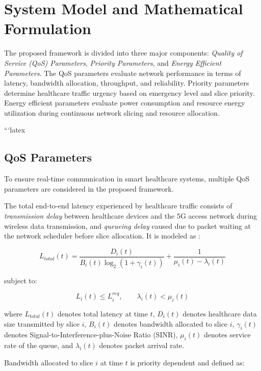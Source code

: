 \documentclass[10pt,journal,compsoc]{IEEEtran}
\begin{document}
\section{System Model and Mathematical Formulation}\label{SecIII}

The proposed framework is divided into three major components: \textit{Quality of Service (QoS) Parameters}, \textit{Priority Parameters}, and \textit{Energy Efficient Parameters}. The QoS parameters evaluate network performance in terms of latency, bandwidth allocation, throughput, and reliability. Priority parameters determine healthcare traffic urgency based on emergency level and slice priority. Energy efficient parameters evaluate power consumption and resource energy utilization during continuous network slicing and resource allocation.



```latex
\subsection{QoS Parameters}

To ensure real-time communication in smart healthcare systems, multiple QoS parameters are considered in the proposed framework.

The total end-to-end latency experienced by healthcare traffic consists of \textit{transmission delay} between healthcare devices and the 5G access network during wireless data transmission, and \textit{queueing delay} caused due to packet waiting at the network scheduler before slice allocation. It is modeled as \cite{yaqoob2026aqps,zheng2025eamem}:

\begin{equation}
L_{total}(t)=\frac{D_i(t)}{B_i(t)\log_2(1+\gamma_i(t))}+\frac{1}{\mu_i(t)-\lambda_i(t)}
\end{equation}

subject to:

\begin{equation}
L_i(t)\leq L_i^{req}, \qquad \lambda_i(t)<\mu_i(t)
\end{equation}

where $L_{total}(t)$ denotes total latency at time $t$, $D_i(t)$ denotes healthcare data size transmitted by slice $i$, $B_i(t)$ denotes bandwidth allocated to slice $i$, $\gamma_i(t)$ denotes Signal-to-Interference-plus-Noise Ratio (SINR), $\mu_i(t)$ denotes service rate of the queue, and $\lambda_i(t)$ denotes packet arrival rate.

Bandwidth allocated to slice $i$ at time $t$ is priority dependent \cite{sarker2026prioritybw} and defined as:
\end{document}
